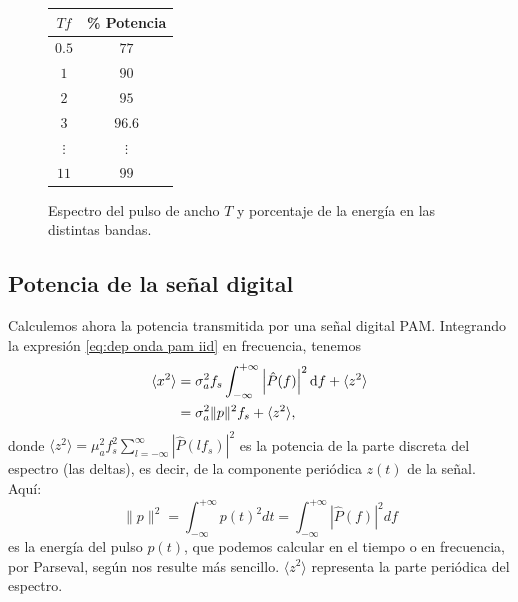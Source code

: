 \begin{figure}
    \begin{center}
    \begin{minipage}{8cm}
    \end{minipage}\hspace{1cm}
    \begin{minipage}{4cm}
        \begin{tabular}{|c|c|}
            \hline 
            $T f$ & \% Potencia \\
            \hline
            $0.5$ & $77$\\
            $1$ & $90$\\
            $2$ & $95$\\
            $3$ & $96.6$\\
            $\vdots$ & $\vdots$ \\
            $11$ & $99$ \\ \hline
        \end{tabular}
    \end{minipage}
    \end{center}
    \caption{Espectro del pulso de ancho $T$ y porcentaje de la energía en las distintas bandas.}\label{fig:espectro pulso}
\end{figure}

\subsection{Potencia de la señal digital}

Calculemos ahora la potencia transmitida por una señal digital PAM. Integrando la expresión \eqref{eq:dep onda pam iid} en frecuencia, tenemos
\begin{align*} \langle x^2 \rangle &= \sigma_a^2
f_s\displaystyle\int_{-\infty}^{+\infty}\left|\hat{P}(f)\right|^2\mathrm{d}
f + \langle z^2\rangle \\
& = \sigma_a^2 \|p\|^2 f_s +\langle z^2\rangle,
\end{align*}
donde $\langle z^2\rangle = \mu_a^2 f_s^2 \sum_{l=-\infty}^{\infty}\left|\hat{P}(lf_s)\right|^2$ es la potencia de la parte discreta del espectro (las deltas), es decir, de la componente periódica $z(t)$ de la señal.
Aquí:  
\begin{equation*}
\|p\|^2 = \int_{-\infty}^{+\infty} p(t)^2 dt = \int_{-\infty}^{+\infty} |\hat{P}(f)|^2 df
\end{equation*}
es la energía del pulso $p(t)$, que podemos calcular en el tiempo o en frecuencia, por Parseval, según nos resulte más sencillo. $\langle z^2\rangle$ representa la parte periódica del espectro.

